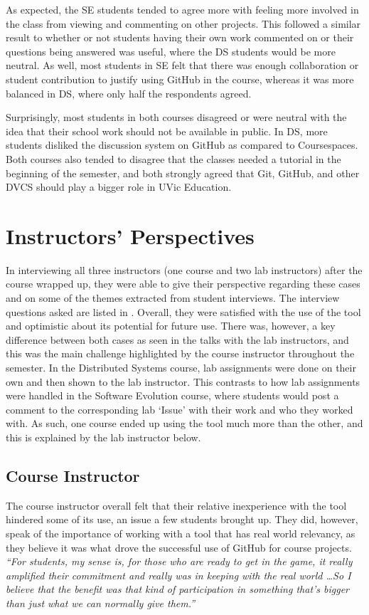 As expected, the SE students tended to agree more with feeling more involved in the class from viewing and commenting on other projects. This followed a similar result to whether or not students having their own work commented on or their questions being answered was useful, where the DS students would be more neutral. As well, most students in SE felt that there was enough collaboration or student contribution to justify using GitHub in the course, whereas it was more balanced in DS, where only half the respondents agreed.

Surprisingly, most students in both courses disagreed or were neutral with the idea that their school work should not be available in public. In DS, more students disliked the discussion system on GitHub as compared to Coursespaces. Both courses also tended to disagree that the classes needed a tutorial in the beginning of the semester, and both strongly agreed that Git, GitHub, and other DVCS should play a bigger role in UVic Education.

\section{Instructors' Perspectives}
In interviewing all three instructors (one course and two lab instructors) after the course wrapped up, they were able to give their perspective regarding these cases and on some of the themes extracted from student interviews. The interview questions asked are listed in . Overall, they were satisfied with the use of the tool and optimistic about its potential for future use. There was, however, a key difference between both cases as seen in the talks with the lab instructors, and this was the main challenge highlighted by the course instructor throughout the semester. In the Distributed Systems course, lab assignments were done on their own and then shown to the lab instructor. This contrasts to how lab assignments were handled in the Software Evolution course, where students would post a comment to the corresponding lab `Issue' with their work and who they worked with. As such, one course ended up using the tool much more than the other, and this is explained by the lab instructor below.

\subsection{Course Instructor}
The course instructor overall felt that their relative inexperience with the tool hindered some of its use, an issue a few students brought up. They did, however, speak of the importance of working with a tool that has real world relevancy, as they believe it was what drove the successful use of GitHub for course projects. \textit{``For students, my sense is, for those who are ready to get in the game, it really amplified their commitment and really was in keeping with the real world \ldots So I believe that the benefit was that kind of participation in something that's bigger than just what we can normally give them.''}

